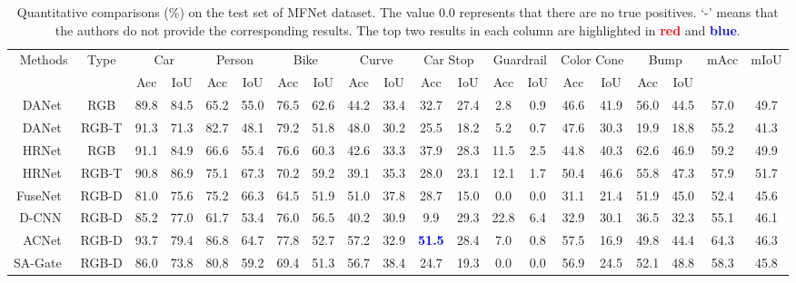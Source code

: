 \documentclass[journal]{IEEEtran}
\begin{document}
\begin{table*}[t!]
  \centering
  \small
  \renewcommand{\arraystretch}{1.4}
  \renewcommand{\tabcolsep}{0.9mm}
  \caption{
  Quantitative comparisons (\%) on the test set of MFNet dataset. The value 0.0 represents that there are no true positives.
  `-' means that the authors do not provide the corresponding results.
  The top two results in each column are highlighted in \textcolor{red}{\textbf{red}} and \textcolor{blue}{\textbf{blue}}.
    }
\label{table:QuantitativeResults_MFNet}
  
\begin{tabular}{r|c|cccccccccccccccccc}
\midrule[1pt]    
 \multirow{2}{*}{\normalsize{Methods}} &  \multirow{2}{*}{\normalsize{Type}}
 & \multicolumn{2}{c}{Car} & \multicolumn{2}{c}{Person} & \multicolumn{2}{c}{Bike} & \multicolumn{2}{c}{Curve} & \multicolumn{2}{c}{Car Stop} & \multicolumn{2}{c}{Guardrail} & \multicolumn{2}{c}{Color Cone} & \multicolumn{2}{c}{Bump}  
 & \multirow{2}{*}{\normalsize{mAcc}} & \multirow{2}{*}{\normalsize{mIoU}} \\
 
\cline{3-18} 
     &  & Acc & IoU & Acc & IoU & Acc & IoU & Acc & IoU & Acc & IoU & Acc & IoU & Acc & IoU & Acc & IoU \\
	     
\midrule[1pt] DANet~\cite{2019DANet}  & RGB & 89.8 & 84.5 & 65.2 & 55.0 & 76.5 & 62.6 & 44.2 & 33.4 & 32.7 & 27.4 & 2.8 & 0.9 & 46.6 & 41.9 & 56.0 & 44.5 & 57.0 & 49.7 \\	
DANet~\cite{2019DANet}   & RGB-T & 91.3 & 71.3 & 82.7 & 48.1 & 79.2 & 51.8 & 48.0 & 30.2 & 25.5 & 18.2 & 5.2 & 0.7 & 47.6 & 30.3 &19.9 & 18.8 & 55.2 & 41.3 \\

\hline 
HRNet~\cite{2019HRNet}   & RGB & 91.1 & 84.9 & 66.6 & 55.4 & 76.6 & 60.3 & 42.6 & 33.3 & 37.9 & 28.3 & 11.5 & 2.5 & 44.8 & 40.3 & 62.6 & 46.9 & 59.2 & 49.9 \\	
HRNet~\cite{2019HRNet}   & RGB-T & 90.8 & 86.9 & 75.1 & 67.3 & 70.2 & 59.2 & 39.1 & 35.3 & 28.0 & 23.1 & 12.1 & 1.7 & 50.4 & 46.6 & 55.8 & 47.3 & 57.9 & 51.7  \\	
								   						
\hline FuseNet~\cite{2016FuseNet}  & RGB-D & 81.0 & 75.6 & 75.2 & 66.3 & 64.5 & 51.9 & 51.0 & 37.8 & 28.7 & 15.0 & 0.0 & 0.0 & 31.1 & 21.4 & 51.9 & 45.0 & 52.4 & 45.6 \\	
D-CNN~\cite{2018D-CNN}     & RGB-D & 85.2 & 77.0 & 61.7 & 53.4 & 76.0 & 56.5 & 40.2 & 30.9 & 9.9 & 29.3 & 22.8 & 6.4 & 32.9 & 30.1 & 36.5 & 32.3 & 55.1 & 46.1 \\	
ACNet~\cite{2019ACNet}     & RGB-D & 93.7 & 79.4 & 86.8 & 64.7 & 77.8 & 52.7 & 57.2 & 32.9 & \textcolor{blue}{\textbf{51.5}} & 28.4 & 7.0 & 0.8 & 57.5 & 16.9 & 49.8 & 44.4 & 64.3 & 46.3\\	
SA-Gate~\cite{2020SA-Gate}    & RGB-D & 86.0 & 73.8 & 80.8 & 59.2 & 69.4 & 51.3 & 56.7 & 38.4 & 24.7 & 19.3 & 0.0 & 0.0 & 56.9 & 24.5 & 52.1 & 48.8 & 58.3 & 45.8 \\


\end{tabular}
\end{table*}
\end{document}
